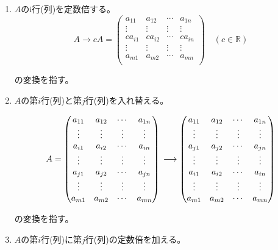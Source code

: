 \documentclass[dvipdfmx,autodetect-engine]{jsarticle}
\theoremstyle{definition}
\begin{document}
\begin{enumerate}
\renewcommand{\labelenumi}{(\arabic{enumi})}
\item $A$のi行(列)を定数倍する。
$$
A \longrightarrow cA = \begin{pmatrix}
a_{11} & a_{12} & \cdots & a_{1n} \\
\vdots & \vdots & \vdots & \vdots \\
ca_{i1} & ca_{i2} & \cdots & ca_{in} \\
\vdots & \vdots & \vdots & \vdots \\
a_{m1} & a_{m2} & \cdots & a_{mn} \\
\end{pmatrix} \quad (c \in \mathbb{R})
$$

の変換を指す。

\item $A$の第$i$行(列)と第$j$行(列)を入れ替える。

$$
A = \begin{pmatrix}
a_{11} & a_{12} & \cdots & a_{1n} \\
\vdots & \vdots & \vdots & \vdots \\
a_{i1} & a_{i2} & \cdots & a_{in} \\
\vdots & \vdots & \vdots & \vdots \\
a_{j1} & a_{j2} & \cdots & a_{jn} \\
\vdots & \vdots & \vdots & \vdots \\
a_{m1} & a_{m2} & \cdots & a_{mn} \\
\end{pmatrix} \\
\longrightarrow \begin{pmatrix}
a_{11} & a_{12} & \cdots & a_{1n} \\
\vdots & \vdots & \vdots & \vdots \\
a_{j1} & a_{j2} & \cdots & a_{jn} \\
\vdots & \vdots & \vdots & \vdots \\
a_{i1} & a_{i2} & \cdots & a_{in} \\
\vdots & \vdots & \vdots & \vdots \\
a_{m1} & a_{m2} & \cdots & a_{mn} \\
\end{pmatrix}
$$

の変換を指す。

\item $A$の第$i$行(列)に第$j$行(列)の定数倍を加える。


\end{enumerate}
\end{document}
